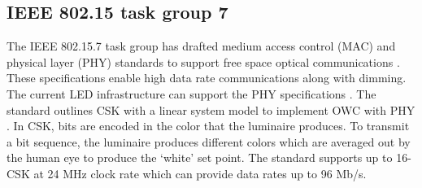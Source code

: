 \subsection{IEEE 802.15 task group 7}
\label{relatedStandard}
The IEEE 802.15.7 task group has drafted medium access control (MAC) and physical layer (PHY) standards to support free space optical communications \cite{IEEE802.15.7}. These specifications enable high data rate communications along with dimming. The current LED infrastructure can support the PHY  specifications \cite{raj12a}. The standard outlines CSK with a linear system model to implement OWC with PHY . In CSK, bits are encoded in the color that the luminaire produces. To transmit a bit sequence, the luminaire produces different colors which are averaged out by the human eye to produce the `white' set point. The standard supports up to 16-CSK at 24 MHz clock rate which can provide data rates up to 96 Mb/s.
